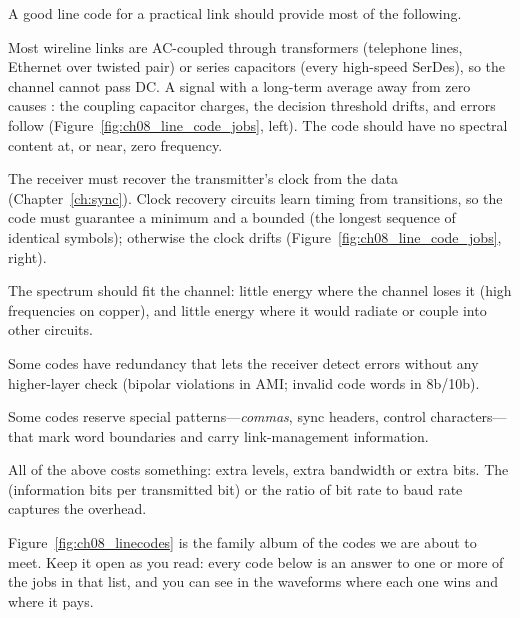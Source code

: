 A good line code for a practical link should provide most of the following.
\begin{description}[style=nextline,leftmargin=1.2em,font=\sffamily\bfseries\small\color{navy}]
\item[DC balance.] Most wireline links are AC-coupled through transformers (telephone lines,
Ethernet over twisted pair) or series capacitors (every high-speed SerDes), so the channel
cannot pass DC. A signal with a long-term average away from zero causes : the coupling capacitor charges, the decision threshold drifts, and errors follow
(Figure~\ref{fig:ch08_line_code_jobs}, left). The code should have no spectral content at, or
near, zero frequency.
\item[Clock content.] The receiver must recover the transmitter's clock from the data
(Chapter~\ref{ch:sync}). Clock recovery circuits learn timing from transitions, so the code
must guarantee a minimum  and a bounded  (the
longest sequence of identical symbols); otherwise the clock drifts
(Figure~\ref{fig:ch08_line_code_jobs}, right).
\item[Spectral shape.] The spectrum should fit the channel: little energy where the channel
loses it (high frequencies on copper), and little energy where it would radiate or couple
into other circuits.
\item[Error monitoring.] Some codes have redundancy that lets the receiver detect errors
without any higher-layer check (bipolar violations in AMI; invalid code words in 8b/10b).
\item[Framing and control.] Some codes reserve special patterns---\emph{commas}, sync
headers, control characters---that mark word boundaries and carry link-management
information.
\item[Efficiency.] All of the above costs something: extra levels, extra bandwidth or extra
bits. The  (information bits per transmitted bit) or the ratio of bit rate to
baud rate captures the overhead.
\end{description}

Figure~\ref{fig:ch08_linecodes} is the family album of the codes we are about to meet. Keep it
open as you read: every code below is an answer to one or more of the jobs in that list, and
you can see in the waveforms where each one wins and where it pays.


